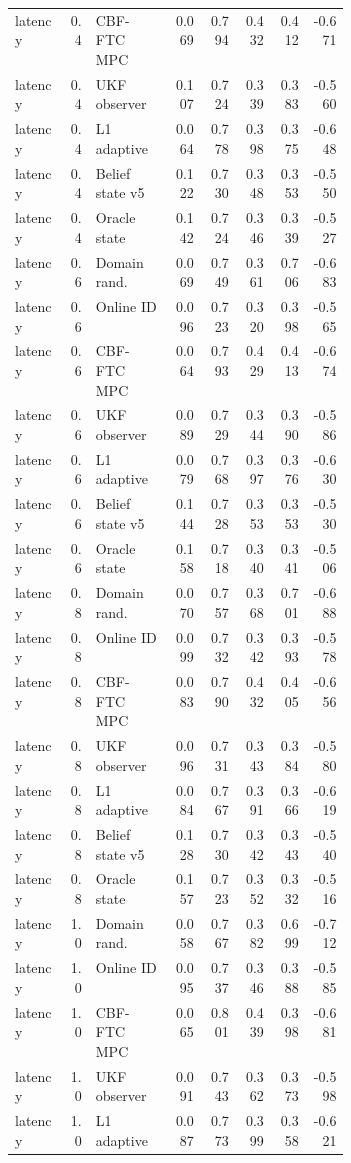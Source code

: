 \documentclass{article}
\begin{document}
\begin{center}
\begin{longtable}{p{0.16\linewidth}rp{0.23\linewidth}rrrrr}
latency & 0.4 & CBF-FTC MPC & 0.069 & 0.794 & 0.432 & 0.412 & -0.671\\
latency & 0.4 & UKF observer & 0.107 & 0.724 & 0.339 & 0.383 & -0.560\\
latency & 0.4 & L1 adaptive & 0.064 & 0.778 & 0.398 & 0.375 & -0.648\\
latency & 0.4 & Belief state v5 & 0.122 & 0.730 & 0.348 & 0.353 & -0.550\\
latency & 0.4 & Oracle state & 0.142 & 0.724 & 0.346 & 0.339 & -0.527\\
latency & 0.6 & Domain rand. & 0.069 & 0.749 & 0.361 & 0.706 & -0.683\\
latency & 0.6 & Online ID & 0.096 & 0.723 & 0.320 & 0.398 & -0.565\\
latency & 0.6 & CBF-FTC MPC & 0.064 & 0.793 & 0.429 & 0.413 & -0.674\\
latency & 0.6 & UKF observer & 0.089 & 0.729 & 0.344 & 0.390 & -0.586\\
latency & 0.6 & L1 adaptive & 0.079 & 0.768 & 0.397 & 0.376 & -0.630\\
latency & 0.6 & Belief state v5 & 0.144 & 0.728 & 0.353 & 0.353 & -0.530\\
latency & 0.6 & Oracle state & 0.158 & 0.718 & 0.340 & 0.341 & -0.506\\
latency & 0.8 & Domain rand. & 0.070 & 0.757 & 0.368 & 0.701 & -0.688\\
latency & 0.8 & Online ID & 0.099 & 0.732 & 0.342 & 0.393 & -0.578\\
latency & 0.8 & CBF-FTC MPC & 0.083 & 0.790 & 0.432 & 0.405 & -0.656\\
latency & 0.8 & UKF observer & 0.096 & 0.731 & 0.343 & 0.384 & -0.580\\
latency & 0.8 & L1 adaptive & 0.084 & 0.767 & 0.391 & 0.366 & -0.619\\
latency & 0.8 & Belief state v5 & 0.128 & 0.730 & 0.342 & 0.343 & -0.540\\
latency & 0.8 & Oracle state & 0.157 & 0.723 & 0.352 & 0.332 & -0.516\\
latency & 1.0 & Domain rand. & 0.058 & 0.767 & 0.382 & 0.699 & -0.712\\
latency & 1.0 & Online ID & 0.095 & 0.737 & 0.346 & 0.388 & -0.585\\
latency & 1.0 & CBF-FTC MPC & 0.065 & 0.801 & 0.439 & 0.398 & -0.681\\
latency & 1.0 & UKF observer & 0.091 & 0.743 & 0.362 & 0.373 & -0.598\\
latency & 1.0 & L1 adaptive & 0.087 & 0.773 & 0.399 & 0.358 & -0.621\\

\end{longtable}
\end{center}
\end{document}
